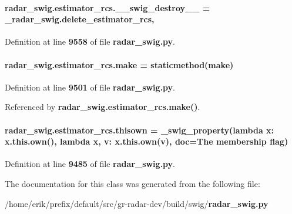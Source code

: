 \paragraph[{\+\_\+\+\_\+swig\+\_\+destroy\+\_\+\+\_\+}]{\setlength{\rightskip}{0pt plus 5cm}radar\+\_\+swig.\+estimator\+\_\+rcs.\+\_\+\+\_\+swig\+\_\+destroy\+\_\+\+\_\+ = \+\_\+radar\+\_\+swig.\+delete\+\_\+estimator\+\_\+rcs\hspace{0.3cm}{\ttfamily [static]}, {\ttfamily [private]}}\label{classradar__swig_1_1estimator__rcs_a2561f7a1820435c26990779937af3662}


Definition at line {\bf 9558} of file {\bf radar\+\_\+swig.\+py}.

\paragraph[{make}]{\setlength{\rightskip}{0pt plus 5cm}radar\+\_\+swig.\+estimator\+\_\+rcs.\+make = staticmethod(make)\hspace{0.3cm}{\ttfamily [static]}}\label{classradar__swig_1_1estimator__rcs_a8ba2f8e3eab372a950c7d2d21bde1a23}


Definition at line {\bf 9501} of file {\bf radar\+\_\+swig.\+py}.



Referenced by {\bf radar\+\_\+swig.\+estimator\+\_\+rcs.\+make()}.

\paragraph[{thisown}]{\setlength{\rightskip}{0pt plus 5cm}radar\+\_\+swig.\+estimator\+\_\+rcs.\+thisown = {\bf \+\_\+swig\+\_\+property}(lambda x\+: x.\+this.\+own(), lambda {\bf x}, v\+: x.\+this.\+own(v), doc=\textquotesingle{}The membership flag\textquotesingle{})\hspace{0.3cm}{\ttfamily [static]}}\label{classradar__swig_1_1estimator__rcs_a1b192b80c052e43270cd5377038f4158}


Definition at line {\bf 9485} of file {\bf radar\+\_\+swig.\+py}.



The documentation for this class was generated from the following file\+:\begin{DoxyCompactItemize}
\item 
/home/erik/prefix/default/src/gr-\/radar-\/dev/build/swig/{\bf radar\+\_\+swig.\+py}\end{DoxyCompactItemize}
